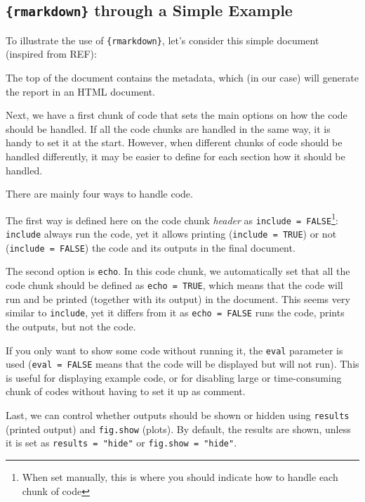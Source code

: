 \documentclass[
]{krantz}
\begin{document}
\hypertarget{rmarkdown-through-a-simple-example}{%
\subsection{\texorpdfstring{\texttt{\{rmarkdown\}} through a Simple Example}{\{rmarkdown\} through a Simple Example}}\label{rmarkdown-through-a-simple-example}}

To illustrate the use of \texttt{\{rmarkdown\}}, let's consider this simple document (inspired from REF):

The top of the document contains the metadata, which (in our case) will generate the report in an HTML document.

Next, we have a first chunk of code that sets the main options on how the code should be handled. If all the code chunks are handled in the same way, it is handy to set it at the start. However, when different chunks of code should be handled differently, it may be easier to define for each section how it should be handled.

There are mainly four ways to handle code.

The first way is defined here on the code chunk \emph{header} as \texttt{include\ =\ FALSE}\footnote{When set manually, this is where you should indicate how to handle each chunk of code}: \texttt{include} always run the code, yet it allows printing (\texttt{include\ =\ TRUE}) or not (\texttt{include\ =\ FALSE}) the code and its outputs in the final document.

The second option is \texttt{echo}. In this code chunk, we automatically set that all the code chunk should be defined as \texttt{echo\ =\ TRUE}, which means that the code will run and be printed (together with its output) in the document. This seems very similar to \texttt{include}, yet it differs from it as \texttt{echo\ =\ FALSE} runs the code, prints the outputs, but not the code.

If you only want to show some code without running it, the \texttt{eval} parameter is used (\texttt{eval\ =\ FALSE} means that the code will be displayed but will not run). This is useful for displaying example code, or for disabling large or time-consuming chunk of codes without having to set it up as comment.

Last, we can control whether outputs should be shown or hidden using \texttt{results} (printed output) and \texttt{fig.show} (plots). By default, the results are shown, unless it is set as \texttt{results\ =\ "hide"} or \texttt{fig.show\ =\ "hide"}.
\end{document}
